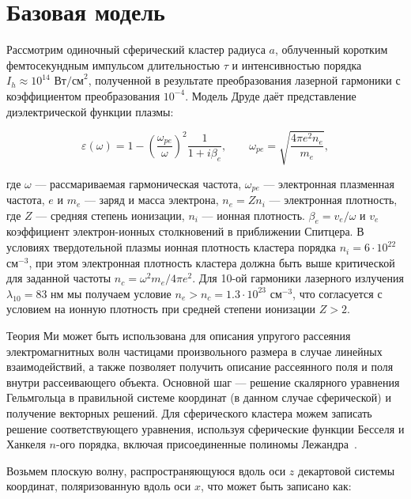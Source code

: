 \section{Базовая модель}

Рассмотрим одиночный сферический кластер радиуса $a$, облученный коротким фемтосекундным импульсом длительностью $\tau$ и интенсивностью порядка $I_{h} \approx 10^{14}$ $\textrm{Вт/см}^2$, полученной в результате преобразования лазерной гармоники с коэффициентом преобразования $10^{-4}$. Модель Друде даёт представление диэлектрической функции плазмы:

    \begin{equation}
		\varepsilon (\omega) = 1 - {\left( \frac{\omega_{pe}}{\omega} \right)}^2 \frac{1}{1+i \beta_{e}}, \qquad \omega_{pe} = \sqrt{\frac{4 \pi e^2 n_e}{m_e}},
		\label{eps_plasma}
    \end{equation}

\noindent где $\omega$ --- рассмариваемая гармоническая частота, $\omega_{pe}$ --- электронная плазменная частота, $e$ и $m_e$ --- заряд и масса электрона, $n_e = Z n_i$ --- электронная плотность, где $Z$ --- средняя степень ионизации, $n_i$ --- ионная плотность. $\beta_{e} = v_e / \omega$ и $v_e$ коэффициент электрон-ионных столкновений в приближении Спитцера. В условиях твердотельной плазмы ионная плотность кластера порядка $n_i = 6 \cdot 10^{22}$ $\textrm{см}^{-3}$, при этом электронная плотность кластера должна быть выше критической для заданной частоты $n_c = \omega^2 m_e / 4 \pi e^2$. Для 10-ой гармоники лазерного излучения $\lambda_{10} = 83$ нм мы получаем условие $n_e > n_c = 1.3 \cdot 10^{23}$ $\textrm{см}^{-3}$, что согласуется с условием на ионную плотность при средней степени ионизации $Z > 2$.

Теория Ми может быть использована для описания упругого рассеяния электромагнитных волн частицами произвольного размера в случае линейных взаимодействий, а также позволяет получить описание рассеянного поля и поля внутри рассеивающего объекта. Основной шаг --- решение скалярного уравнения Гельмгольца в правильной системе координат (в данном случае сферической) и получение векторных решений. Для сферического кластера можем записать решение соответствующего уравнения, используя сферические функции Бесселя и Ханкеля $n$-ого порядка, включая присоединенные полиномы Лежандра~\cite{boren_huffman}.

Возьмем плоскую волну, распространяющуюся вдоль оси $z$ декартовой системы координат, поляризованную вдоль оси $x$, что может быть записано как:

